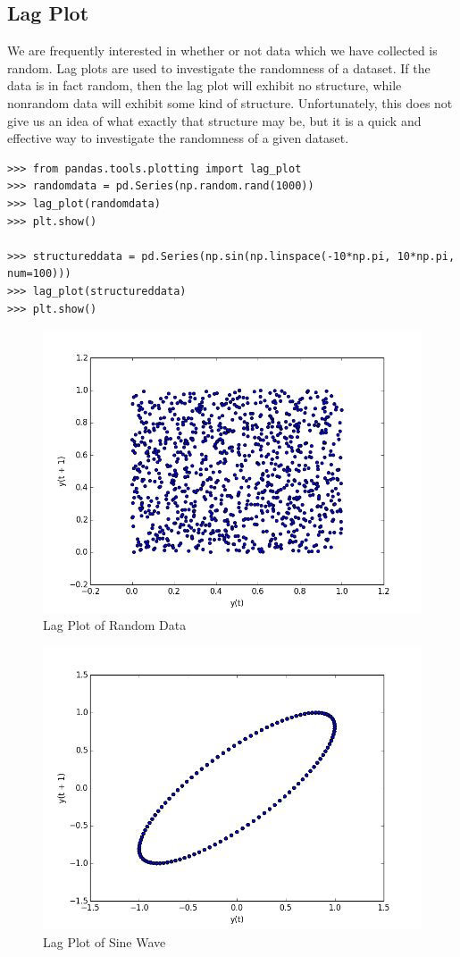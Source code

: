 \subsection*{Lag Plot}
 We are frequently interested in whether or not data which we have collected is random. Lag plots are used to investigate the randomness of a dataset. If the data is in fact random, then the lag plot will exhibit no structure, while nonrandom data will exhibit some kind of structure. Unfortunately, this does not give us an idea of what exactly that structure may be, but it is a quick and effective way to investigate the randomness of a given dataset.
\begin{lstlisting}
>>> from pandas.tools.plotting import lag_plot
>>> randomdata = pd.Series(np.random.rand(1000))
>>> lag_plot(randomdata)
>>> plt.show()

>>> structureddata = pd.Series(np.sin(np.linspace(-10*np.pi, 10*np.pi, num=100)))
>>> lag_plot(structureddata)
>>> plt.show()
\end{lstlisting}


\begin{figure}[H]
    \centering
    \includegraphics[width=.75\textwidth]{randomdata.png}
    \caption{Lag Plot of Random Data}
\end{figure}


\begin{figure}[H]
    \centering
    \includegraphics[width=.75\textwidth]{structureddata.png}
    \caption{Lag Plot of Sine Wave}
\end{figure}

